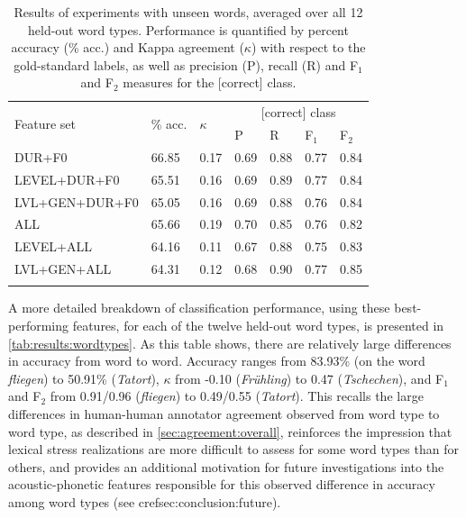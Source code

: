 	
	\begin{table}
			\centering
			\caption[Results of experiments with unseen words]{Results of experiments with unseen words, averaged over all 12 held-out word types.
			Performance is quantified by percent accuracy (\% acc.) and Kappa agreement ($\kappa$) with respect to the gold-standard labels, as well as precision (P), recall (R) and F$_1$ and F$_2$ measures for the [correct] class. 
			}
			\begin{tabularx}{.8\textwidth}{lXXXXXX}		
			\toprule
			\multirow{2}{*}{Feature set} & \multirow{2}{*}{\% acc.} & \multirow{2}{*}{$\kappa$} & \multicolumn{4}{c}{[correct] class} \\
			\cmidrule(lr){4-7}
			& & & P & R & F$_1$ & F$_2$ \\
			\midrule
DUR+F0	&	66.85	&	0.17	&	0.69	&	0.88	&	0.77	&	0.84	\\
{LEVEL+DUR+F0}	&	65.51	&	0.16	&	0.69	&	0.89	&	0.77	&	0.84	\\
{LVL+GEN+DUR+F0}	&	65.05	&	0.16	&	0.69	&	0.88	&	0.76	&	0.84	\\
			\midrule								
ALL	&	65.66	&	0.19	&	0.70	&	0.85	&	0.76	&	0.82	\\
{LEVEL+ALL}	&	64.16	&	0.11	&	0.67	&	0.88	&	0.75	&	0.83	\\
{LVL+GEN+ALL}	&	64.31	&	0.12	&	0.68	&	0.90	&	0.77	&	0.85	\\

		\bottomrule
			\label{tab:results:words}
			\end{tabularx}
		\end{table}	
	
	
	A more detailed breakdown of classification performance, using these best-performing features, for each of the twelve held-out word types, is presented in \cref{tab:results:wordtypes}. As this table shows, there are relatively large differences in accuracy from word to word. Accuracy ranges from 83.93\% (on the word \textit{fliegen}) to 50.91\% (\textit{Tatort}), $\kappa$ from -0.10 (\textit{Fr\"uhling}) to 0.47 (\textit{Tschechen}), and F$_1$ and F$_2$ from 0.91/0.96 (\textit{fliegen}) to 0.49/0.55 (\textit{Tatort}). This recalls the large differences in human-human annotator agreement observed from word type to word type, as described in \cref{sec:agreement:overall}, reinforces the impression that lexical stress realizations are more difficult to assess for some word types than for others, and provides an additional motivation for future investigations into the acoustic-phonetic features responsible for this observed difference in accuracy among word types (see cref{sec:conclusion:future}).
	
